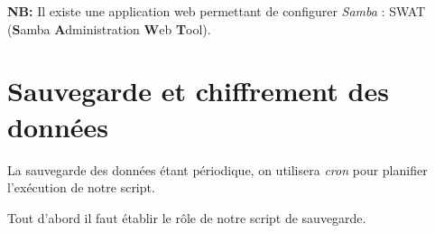 \textbf{NB:} Il existe une application web permettant de configurer \textit{Samba} :
SWAT (\textbf{S}amba \textbf{A}dministration \textbf{W}eb \textbf{T}ool).

\section{Sauvegarde et chiffrement des données}

La sauvegarde des données étant périodique, on utilisera \textit{cron} pour planifier
l'exécution de notre script.

Tout d'abord il faut établir le rôle de notre script de sauvegarde.

